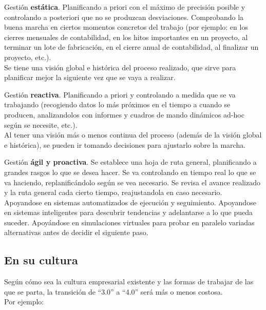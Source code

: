 \documentclass[spanish,12pt,a4paper,final,oneside]{book}
\begin{document}
\begin{description}
\item Gestión \textbf{estática}. Planificando a priori con el máximo de precisión posible y controlando a posteriori que no se produzcan desviaciones. Comprobando la buena marcha en ciertos momentos concretos del trabajo (por ejemplo: en los cierres mensuales de contabilidad, en los hitos importantes en un proyecto, al terminar un lote de fabricación, en el cierre anual de contabilidad, al finalizar un proyecto, etc.).
\\Se tiene una visión global e histórica del proceso realizado, que sirve para planificar mejor la siguiente vez que se vaya a realizar.

\item Gestión \textbf{reactiva}. Planificando a priori y controlando a medida que se va trabajando (recogiendo datos lo más próximos en el tiempo a cuando se producen, analizandolos con informes y cuadros de mando dinámicos ad-hoc según se necesite, etc.).
\\Al tener una visión más o menos continua del proceso (además de la visión global e histórica), se pueden ir tomando decisiones para ajustarlo sobre la marcha.

\item Gestión \textbf{ágil y proactiva}. Se establece una hoja de ruta general, planificando a grandes rasgos lo que se desea hacer. Se va controlando en tiempo real lo que se va haciendo, replanificándolo según se vea necesario. Se revisa el avance realizado y la ruta general cada cierto tiempo, reajustandola en caso necesario.
\\Apoyandose en sistemas automatizados de ejecución y seguimiento. Apoyandose en sistemas inteligentes para descubrir tendencias y adelantarse a lo que pueda suceder. Apoyándose en simulaciones virtuales para probar en paralelo variadas alternativas antes de decidir el siguiente paso.
\end{description}

\subsection{En su cultura}

Según cómo sea la cultura empresarial existente y las formas de trabajar de las que se parta, la transición de ``3.0'' a ``4.0'' será más o menos costosa. 
\\Por ejemplo:
\end{document}
